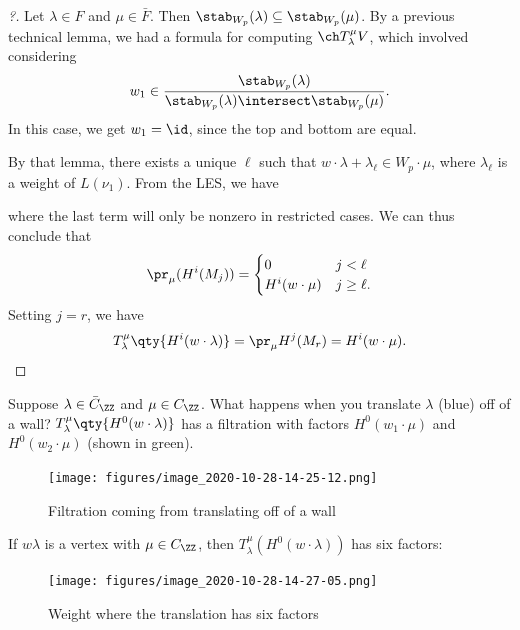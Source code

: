 \begin{proof}[?]

Let \(\lambda \in F\) and \(\mu\in\bar{F}\). Then
\(\stab_{W_p}(\lambda) \subseteq \stab_{W_p}(\mu)\). By a previous
technical lemma, we had a formula for computing \(\ch T_\lambda^\mu V\),
which involved considering
\begin{align*}  
w_1 \in {\stab_{W_p}(\lambda) \over \stab_{W_p}(\lambda) \intersect \stab_{W_p}(\mu)}
.\end{align*} In this case, we get \(w_1 = \id\), since the top and
bottom are equal.

By that lemma, there exists a unique \(\ell\) such that
\(w\cdot \lambda + \lambda_\ell \in W_p\cdot \mu\), where
\(\lambda_\ell\) is a weight of \(L(\nu_1)\). From the LES, we have

\begin{center}\end{center}

where the last term will only be nonzero in restricted cases. We can
thus conclude that
\begin{align*}  
\pr_\mu(H^i(M_j))  =
\begin{cases}
0 & j< \ell \\
H^i(w\cdot \mu) & j\geq \ell.
\end{cases}
\end{align*} Setting \(j=r\), we have
\begin{align*}  
T_\lambda^\mu \qty{H^i(w\cdot\lambda)} = \pr_\mu H^j(M_r) = H^i(w\cdot \mu)
.\end{align*}

\end{proof}

Suppose \(\lambda \in \bar{C}_\ZZ\) and \(\mu \in C_\ZZ\). What happens
when you translate \(\lambda\) (blue) off of a wall?
\(T_\lambda^\mu\qty{H^0(w\cdot \lambda)}\) has a filtration with factors
\(H^0(w_1\cdot \mu)\) and \(H^0(w_2\cdot \mu)\) (shown in green).

\begin{figure}
\centering
\texttt{[image: figures/image\_2020-10-28-14-25-12.png]}
\caption{Filtration coming from translating off of a wall}
\end{figure}

If \(w\lambda\) is a vertex with \(\mu \in C_\ZZ\), then
\(T_\lambda^\mu(H^0(w\cdot \lambda))\) has six factors:

\begin{figure}
\centering
\texttt{[image: figures/image\_2020-10-28-14-27-05.png]}
\caption{Weight where the translation has six factors}
\end{figure}


